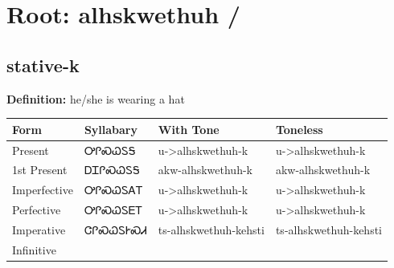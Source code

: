 \documentclass{article}%
\begin{document}
%
\normalsize%
\section*{Root: alhskwethuh / }%
\subsection*{stative-k}%
\textbf{Definition: }%
he/she is wearing a hat%
\\[0.5em]%
\begin{tabular}{|l|l|l|l|}%
\hline%
\textbf{Form}&\textbf{Syllabary}&\textbf{With Tone}&\textbf{Toneless}\\%
\hline%
Present&ᎤᎵᏍᏇᏚᎦ&u{-}>alhskwethuh{-}k&u{-}>alhskwethuh{-}k\\%
1st Present&ᎠᏆᎵᏍᏇᏚᎦ&akw{-}alhskwethuh{-}k&akw{-}alhskwethuh{-}k\\%
Imperfective&ᎤᎵᏍᏇᏚᎪᎢ&u{-}>alhskwethuh{-}k&u{-}>alhskwethuh{-}k\\%
Perfective&ᎤᎵᏍᏇᏚᎬᎢ&u{-}>alhskwethuh{-}k&u{-}>alhskwethuh{-}k\\%
Imperative&ᏣᎵᏍᏇᏚᎨᏍᏗ&ts{-}alhskwethuh{-}kehsti&ts{-}alhskwethuh{-}kehsti\\%
Infinitive&&&\\%
\hline%
\end{tabular}%
\\[1em]%
\end{document}
